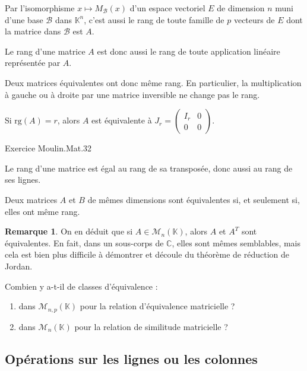 \documentclass[french]{article}
\newcommand{\C}{\mathbb{C}}
\newcommand{\K}{\mathbb{K}}
\newcommand{\rg}{\text{rg}}
\theoremstyle{plain}
\theoremstyle{definition}
\newtheorem*{rmq}{Remarque}
\theoremstyle{remark}
\begin{document}
Par l'isomorphisme $x\mapsto M_\mathcal{B}(x)$ d'un espace vectoriel $E$ de dimension $n$ muni d'une base $\mathcal{B}$ dans $\K^n$, c'est aussi le rang de toute famille de $p$ vecteurs de $E$ dont la matrice dans $\mathcal{B}$ est $A$.

Le rang d'une matrice $A$ est donc aussi le rang de toute application linéaire représentée par $A$.

Deux matrices équivalentes ont donc même rang. En particulier, la multiplication à gauche ou à droite par une matrice inversible ne change pas le rang.

\begin{prop}%
	Si $\rg(A)=r$, alors $A$ est équivalente à $J_r=\begin{pmatrix}
		I_r&0\\
		0&0
	\end{pmatrix}$.
\end{prop}

Exercice Moulin.Mat.32

\begin{cor}%
	Le rang d'une matrice est égal au rang de sa transposée, donc aussi au rang de ses lignes.
\end{cor}

\begin{cor}%
	Deux matrices $A$ et $B$ de mêmes dimensions sont équivalentes si, et seulement si, elles ont même rang.
\end{cor}

\begin{rmq}
	On en déduit que si $A\in\mathcal{M}_n(\K)$, alors $A$ et $A^T$ sont équivalentes. En fait, dans un sous-corps de $\C$, elles sont mêmes semblables, mais cela est bien plus difficile à démontrer et découle du théorème de réduction de Jordan.
\end{rmq}

\begin{exo}
	Combien y a-t-il de classes d'équivalence :
	\begin{enumerate}
		\item dans $\mathcal{M}_{n,p}(\K)$ pour la relation d'équivalence matricielle ? %
		\item dans $\mathcal{M}_n(\K)$ pour la relation de similitude matricielle ? %
	\end{enumerate}
\end{exo}

\subsection{Opérations sur les lignes ou les colonnes}
\end{document}
